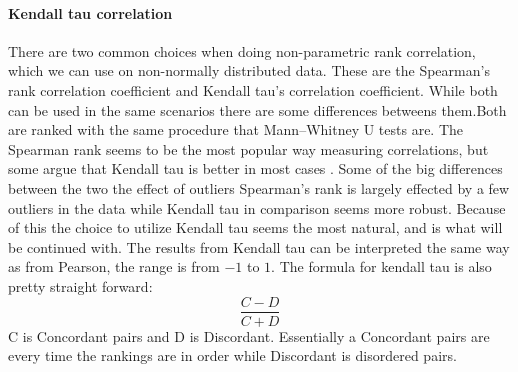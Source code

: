 \paragraph{Kendall tau correlation}
There are two common choices when doing non-parametric rank correlation, which we can use on non-normally distributed data. These are the Spearman's rank correlation coefficient and Kendall tau's correlation coefficient. While both can be used in the same scenarios there are some differences betweens them.Both are ranked with the same procedure that Mann–Whitney U tests are. The Spearman rank seems to be the most popular way measuring correlations, but some argue that Kendall tau is better in most cases \cite{gilpin1993table}. Some of the big differences between the two the effect of outliers Spearman's rank is largely effected by a few outliers in the data while Kendall tau in comparison seems more robust. Because of this the choice to utilize Kendall tau seems the most natural, and is what will be continued with. The results from Kendall tau can be interpreted the same way as from Pearson, the range is from $-1$ to $1$. The formula for kendall tau is also pretty straight forward:
$$\frac{C-D}{C+D}$$
C is Concordant pairs and D is Discordant. Essentially a Concordant pairs are every time the rankings are in order while Discordant is disordered pairs\cite{kendall1938new}.

